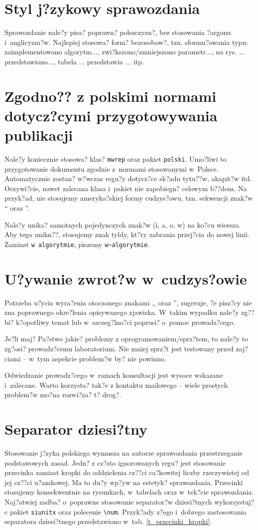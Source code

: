 \section{Styl j?zykowy sprawozdania}
Sprawozdanie nale?y pisa? poprawn? polszczyzn?, bez stosowania ?argonu i~anglicyzm?w. Najlepiej stosowa? form? bezosobow?, tzn. sformu?owania typu: zaimplementowano algorytm..., zwi?kszono/zmniejszono parametr..., na rys. ... przedstawiono..., tabela ... przedstawia ... itp.

\section{Zgodno?? z polskimi normami dotycz?cymi przygotowywania publikacji}
Nale?y koniecznie stosowa? klas? \verb+mwrep+ oraz pakiet \verb+polski+. Umo?liwi to przygotowanie dokumentu zgodnie z~normami stosowanymi w~Polsce. Automatycznie zostan? w?wczas regu?y dotycz?ce sk?adu tytu??w, akapit?w itd. Oczywi?cie, nawet zalecana klasa i~pakiet nie zapobiegn? celowym b??dom. Na przyk?ad, nie stosujemy ameryka?skiej formy cudzys?owu, tzn. sekwencji znak?w `` oraz ''.

Nale?y unika? samotnych pojedynczych znak?w (i, a, o, w) na ko?cu wiersza. Aby tego unikn??, stosujemy znak tyldy, kt?ry zabrania przej?cia do nowej linii. Zamiast \verb+w algorytmie+, piszemy \verb+w~algorytmie+.

\section{U?ywanie zwrot?w w~cudzys?owie}
Potrzeba u?ycia wyra?enia otoczonego znakami ,, oraz '', sugeruje, ?e pisz?cy nie zna poprawnego okre?lenia opisywanego zjawiska. W~takim wypadku nale?y zg??bi? k?opotliwy temat lub w~szczeg?lno?ci poprosi? o~pomoc prowadz?cego.

Je?li maj? Pa?stwo jakie? problemy z oprogramowaniem/sprz?tem, to nale?y to zg?osi? prowadz?cemu laboratorium. Nie mniej sprz?t jest testowany przed zaj?ciami -- w~tym aspekcie problem?w by? nie powinno. 

Odwiedzanie prowadz?cego w~ramach konsultacji jest wysoce wskazane i~zalecane. Warto korzysta? tak?e z kontaktu mailowego -- wiele prostych problem?w mo?na rozwi?za? t? drog?.

\section{Separator dziesi?tny}
Stosowanie j?zyka polskiego wymusza na autorze sprawozdania przestrzeganie podstawowych zasad. Jedn? z cz?sto ignorowanych regu? jest stosowanie przecinka zamiast kropki do oddzielenia cz??ci ca?kowitej liczby rzeczywistej od jej cz??ci u?amkowej. Ma to du?y wp?yw na estetyk? sprawozdania. Przecinki stosujemy konsekwentnie na rysunkach, w~tabelach oraz w~tek?cie sprawozdania. Naj?atwiej zadba? o~poprawne stosowanie separator?w dziesi?tnych wykorzystuj?c pakiet \verb+siunitx+ oraz polecenie \verb+\num+. Przyk?ady z?ego i~dobrego zastosowania separatora dziesi?tnego przedstawiono w~tab. \ref{t_przecinki_kropki}.

